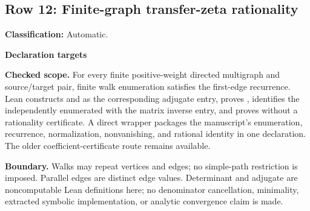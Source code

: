 \subsection{Row 12: Finite-graph transfer-zeta rationality}
\label{row:12}
\textbf{Classification:} Automatic.
\par\smallskip\textbf{Declaration targets}\par
{\small\noindent{}\par}
{\small\noindent{}\par}
{\small\noindent{}\par}
{\small\noindent{}\par}
{\small\noindent{}\par}
{\small\noindent{}\par}
{\small\noindent{}\par}
{\small\noindent{}\par}
{\small\noindent{}\par}
{\small\noindent{}\par}
{\small\noindent{}\par}
{\small\noindent{}\par}
\smallskip\textbf{Checked scope.} For every finite positive-weight directed multigraph and source/target pair, finite walk enumeration satisfies the first-edge recurrence. Lean constructs  and  as the corresponding adjugate entry, proves , identifies the independently enumerated  with the matrix inverse entry, and proves  without a rationality certificate. A direct wrapper packages the manuscript's enumeration, recurrence, normalization, nonvanishing, and rational identity in one declaration. The older coefficient-certificate route remains available.
\par\smallskip\textbf{Boundary.} Walks may repeat vertices and edges; no simple-path restriction is imposed. Parallel edges are distinct edge values. Determinant and adjugate are noncomputable Lean definitions here; no denominator cancellation, minimality, extracted symbolic implementation, or analytic convergence claim is made.
\medskip
{}
